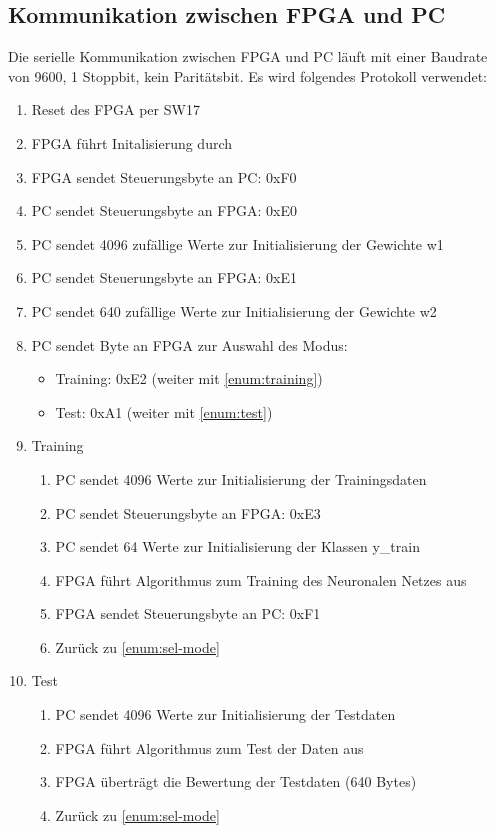 \documentclass
[ 12pt,
  parskip=half %
]{scrreprt}
\begin{document}
\subsection{Kommunikation zwischen FPGA und PC}

Die serielle Kommunikation zwischen FPGA und PC läuft mit einer Baudrate von 9600, 1 Stoppbit, kein Paritätsbit. Es wird folgendes Protokoll verwendet:
\begin{enumerate}
	\item Reset des FPGA per SW17
	\item FPGA führt Initalisierung durch
	\item FPGA sendet Steuerungsbyte an PC: 0xF0
	\item PC sendet Steuerungsbyte an FPGA: 0xE0
	\item PC sendet 4096 zufällige Werte zur Initialisierung der Gewichte w1
	\item PC sendet Steuerungsbyte an FPGA: 0xE1
	\item PC sendet 640 zufällige Werte zur Initialisierung der Gewichte w2
	\item \label{enum:sel-mode} PC sendet Byte an FPGA zur Auswahl des Modus: 
	\begin{itemize}
		\item Training: 0xE2 (weiter mit \ref{enum:training})
		\item Test: 0xA1 (weiter mit \ref{enum:test})
	\end{itemize}
	\item \label{enum:training} Training
	\begin{enumerate}
		\item PC sendet 4096 Werte zur Initialisierung der Trainingsdaten
		\item PC sendet Steuerungsbyte an FPGA: 0xE3
		\item PC sendet 64 Werte zur Initialisierung der Klassen y\_train
		\item FPGA führt Algorithmus zum Training des Neuronalen Netzes aus
		\item FPGA sendet Steuerungsbyte an PC: 0xF1
		\item Zurück zu \ref{enum:sel-mode}
	\end{enumerate} 
	\item \label{enum:test} Test
	\begin{enumerate}
		\item PC sendet 4096 Werte zur Initialisierung der Testdaten
		\item FPGA führt Algorithmus zum Test der Daten aus
		\item FPGA überträgt die Bewertung der Testdaten (640 Bytes)
		\item Zurück zu \ref{enum:sel-mode}
	\end{enumerate} 
\end{enumerate}
\end{document}
